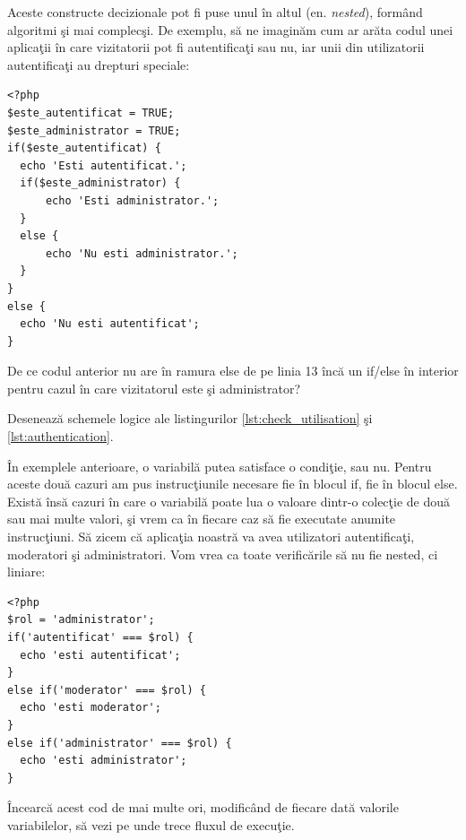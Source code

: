 
Aceste constructe decizionale pot fi puse unul în altul (en. \textsl{nested}),
formând algoritmi şi mai complecşi. De exemplu, să ne imaginăm cum
ar arăta codul unei aplicaţii în care vizitatorii pot fi autentificaţi
sau nu, iar unii din utilizatorii autentificaţi au drepturi speciale:
\begin{lstlisting}[caption={Autentificare}, label=lst:authentication]
<?php
$este_autentificat = TRUE;
$este_administrator = TRUE;
if($este_autentificat) {
  echo 'Esti autentificat.';
  if($este_administrator) {
	  echo 'Esti administrator.';
  }
  else {
	  echo 'Nu esti administrator.';
  }
}
else {
  echo 'Nu esti autentificat';
}
\end{lstlisting}

\begin{Exercise}[title={Întrebare de inteligenţă},difficulty=1]
De ce codul anterior nu are în ramura else de pe linia 13 încă
un if/else în interior pentru cazul în care vizitatorul este
şi administrator?
\end{Exercise}


\begin{Exercise}[title={Schemă logică pornind de la cod PHP},difficulty=1]
Desenează schemele logice ale listingurilor 
\ref{lst:check_utilisation} şi \ref{lst:authentication}.
\end{Exercise}

În exemplele anterioare, o variabilă putea satisface o condiţie, sau nu.
Pentru aceste două cazuri am pus instrucţiunile necesare fie în blocul
{\glqq}if{\grqq}, fie în blocul {\glqq}else{\grqq}.
Există însă cazuri în care o variabilă poate lua o valoare dintr-o colecţie de
două sau mai multe valori, şi vrem ca în fiecare caz să fie
executate anumite instrucţiuni. Să zicem că aplicaţia noastră
va avea utilizatori autentificaţi, moderatori şi administratori.
Vom vrea ca toate verificările să nu fie nested, ci liniare:
\begin{lstlisting}
<?php
$rol = 'administrator';
if('autentificat' === $rol) {
  echo 'esti autentificat';
}
else if('moderator' === $rol) {
  echo 'esti moderator';
}
else if('administrator' === $rol) {
  echo 'esti administrator';
}
\end{lstlisting}
Încearcă acest cod de mai multe ori, modificând de fiecare dată valorile
variabilelor, să vezi pe unde trece fluxul de execuţie.

